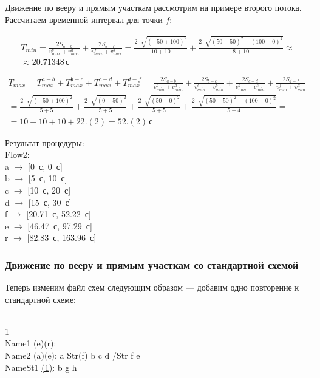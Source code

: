 \documentclass[12pt]{article}
\theoremstyle{plain}
\begin{document}
Движение по вееру и прямым участкам рассмотрим на примере второго потока. Рассчитаем временной интервал для точки $f$:

\begin{multline}
T_{min} = \frac{2S_{a-b}}{v_{max}^b + v_{max}^a} + \frac{2S_{b-f}}{v_{max}^f + v_{max}^b}
= \frac{2\cdot\sqrt{(-50 + 100)^2}}{10 + 10} + \frac{2\cdot\sqrt{(50 + 50)^2 + (100-0)^2}}{8 + 10} \approx \\
 \approx 20.71348\,\text{с}
\end{multline}

\begin{multline}
T_{max} = T_{max}^{a-b} + T_{max}^{b-c} + T_{max}^{c-d} + T_{max}^{d-f} = 
 \frac{2S_{a-b}}{v_{min}^b + v_{min}^a} + \frac{2S_{b-c}}{v_{min}^c + v_{min}^b} +
 \frac{2S_{c-d}}{v_{min}^d + v_{min}^c} + \frac{2S_{d-f}}{v_{min}^f + v_{min}^d} = \\
 =\frac{2\cdot\sqrt{(-50 + 100)^2}}{5 + 5} + \frac{2\cdot\sqrt{(0 + 50)^2}}{5 + 5} +
 \frac{2\cdot\sqrt{(50 - 0)^2}}{5 + 5} + \frac{2\cdot\sqrt{(50 - 50)^2 + (100-0)^2}}{5 + 4} = \\
 = 10 + 10 + 10 + 22.(2) = 52.(2)\,\text{с}
\end{multline}

Результат процедуры:\\
Flow2:\\
a $\rightarrow$ [0~с, 0~с]\\
b $\rightarrow$ [5~с, 10~с]\\
c $\rightarrow$ [10~с, 20~с]\\
d $\rightarrow$ [15~с, 30~с]\\
f $\rightarrow$ [20.71~с, 52.22~с]\\
e $\rightarrow$ [46.47~с, 97.29~с]\\
r $\rightarrow$ [82.83~с, 163.96~с]\\



\subsubsection{Движение по вееру и прямым участкам со стандартной схемой}

Теперь изменим файл схем следующим образом --- добавим одно повторение к стандартной схеме:

\\
1\\
Name1 (e)(r):\\
Name2 (a)(e): a Str(f) b c d /Str f e\\
NameSt1 \underline{(1)}: b g h
\end{document}
